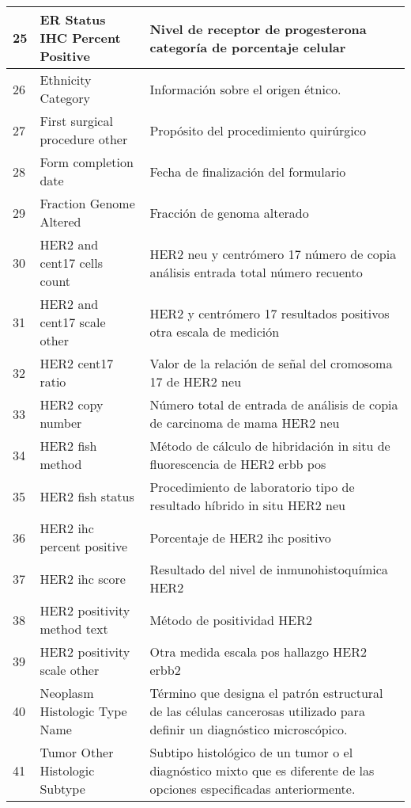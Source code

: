 \begin{table*} [!htb]
	\footnotesize
	\begin{threeparttable}
		\begin{tabular}{p{1cm} p{4cm} p{10cm}}         
			\\ \hline	25	&	ER Status IHC Percent Positive	&	Nivel de receptor de progesterona categoría de porcentaje celular
			\\ \hline	26	&	Ethnicity Category	&	Información sobre el origen étnico.
			\\ \hline	27	&	First surgical procedure other	&	Propósito del procedimiento quirúrgico
			\\ \hline	28	&	Form completion date	&	Fecha de finalización del formulario
			\\ \hline	29	&	Fraction Genome Altered	&	Fracción de genoma alterado
			\\ \hline	30	&	HER2 and cent17 cells count	&	HER2 neu y centrómero 17 número de copia análisis entrada total número recuento
			\\ \hline	31	&	HER2 and cent17 scale other	&	HER2 y centrómero 17 resultados positivos otra escala de medición
			\\ \hline	32	&	HER2 cent17 ratio	&	Valor de la relación de señal del cromosoma 17 de HER2 neu
			\\ \hline	33	&	HER2 copy number	&	Número total de entrada de análisis de copia de carcinoma de mama HER2 neu
			\\ \hline	34	&	HER2 fish method	&	Método de cálculo de hibridación in situ de fluorescencia de HER2 erbb pos
			\\ \hline	35	&	HER2 fish status	&	Procedimiento de laboratorio tipo de resultado híbrido in situ HER2 neu
			\\ \hline	36	&	HER2 ihc percent positive	& Porcentaje de HER2 ihc positivo
			\\ \hline	37	&	HER2 ihc score	&	Resultado del nivel de inmunohistoquímica HER2
			\\ \hline	38	&	HER2 positivity method text	&	Método de positividad HER2
			\\ \hline	39	&	HER2 positivity scale other	&	Otra medida escala pos hallazgo HER2 erbb2 
			\\ \hline	40	&	Neoplasm Histologic Type Name	&	Término que designa el patrón estructural de las células cancerosas utilizado para definir un diagnóstico microscópico.
			\\ \hline	41	&	Tumor Other Histologic Subtype	&	Subtipo histológico de un tumor o el diagnóstico mixto que es diferente de las opciones especificadas anteriormente.

\end{tabular}
\end{threeparttable}
\end{table*}
